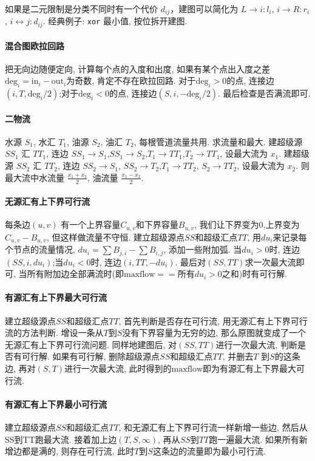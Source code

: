 如果是二元限制是分类不同时有一个代价 $d_{ij}$，建图可以简化为 $L\rightarrow i: l_i$, $i \rightarrow R: r_i$,
$i \leftrightarrow j: d_{ij}$. 经典例子: \texttt{xor} 最小值, 按位拆开建图.

\paragraph{混合图欧拉回路}把无向边随便定向, 计算每个点的入度和出度, 如果有某个点出入度之差$\mathrm{deg}_i=\mathrm{in}_i-\mathrm{out}_i$为奇数, 肯定不存在欧拉回路. 对于$\mathrm{deg}_i>0$的点, 连接边$(i,T,\mathrm{deg}_i/2)$;对于$\mathrm{deg}_i<0$的点, 连接边$(S,i,-\mathrm{deg}_i/2)$. 最后检查是否满流即可. 
\paragraph{二物流}
水源 $S_1$, 水汇 $T_1$, 油源 $S_2$, 油汇 $T_2$, 每根管道流量共用. 求流量和最大.
建超级源 $SS_1$ 汇 $TT_1$, 连边 $SS_1\to S_1$,$SS_1\to S_2$,$T_1\to TT_1$,$T_2 \to TT_1$, 设最大流为 $x_1$.
建超级源 $SS_2$ 汇 $TT_2$, 连边 $SS_2 \to S_1$, $SS_2\to T_2$,$T_1\to TT_2$, $S_2\to TT_2$, 设最大流为 $x_2$.
则最大流中水流量 $\frac{x_1 + x_2}{2}$, 油流量 $\frac{x_1-x_2}{2}$.

\paragraph{无源汇有上下界可行流}
每条边$(u,v)$ 有一个上界容量$C_{u,v}$和下界容量$B_{u,v}$, 我们让下界变为$0$,上界变为$C_{u,v}-B_{u,v}$, 但这样做流量不守恒. 建立超级源点$SS$和超级汇点$TT$, 用$du_i$来记录每个节点的流量情况, $du_i=\sum B_{j,i}-\sum B_{i,j}$, 添加一些附加弧. 当$du_i>0$时, 连边$(SS,i,du_i)$;当$du_i<0$时, 连边$(i,TT,-du_i)$. 最后对$(SS,TT)$求一次最大流即可, 当所有附加边全部满流时(即$\mathrm{maxflow}==所有du_i>0之和$)时有可行解. 
\paragraph{有源汇有上下界最大可行流}
建立超级源点$SS$和超级汇点$TT$, 首先判断是否存在可行流, 用无源汇有上下界可行流的方法判断. 增设一条从$T$到$S$没有下界容量为无穷的边, 那么原图就变成了一个无源汇有上下界可行流问题. 同样地建图后, 对$(SS,TT)$进行一次最大流, 判断是否有可行解. 
如果有可行解, 删除超级源点$SS$和超级汇点$TT$, 并删去$T$ 到$S$的这条边, 再对$(S,T)$进行一次最大流, 此时得到的$\mathrm{maxflow}$即为有源汇有上下界最大可行流. 
\paragraph{有源汇有上下界最小可行流}
建立超级源点$SS$和超级汇点$TT$, 和无源汇有上下界可行流一样新增一些边, 然后从SS到TT跑最大流. 接着加上边$(T,S,\infty)$, 再从$SS$到$TT$跑一遍最大流. 
如果所有新增边都是满的, 则存在可行流, 此时$T$到$S$这条边的流量即为最小可行流. 

